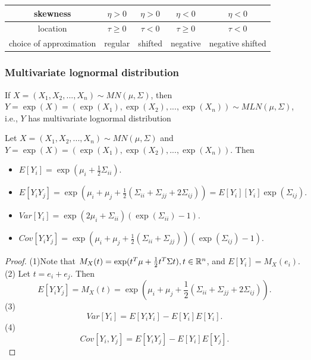 \begin{refsection}
\begin{note}
	
\begin{center}
	\begin{tabular}{|c|c|c|c|c|}
		\hline
		skewness                & $\eta > 0$   & $\eta>0$   & $\eta<0$      & $\eta<0$         \\ \hline
		location                & $\tau\geq 0$ & $\tau < 0$ & $\tau \geq 0$ & $\tau < 0$       \\ \hline
		choice of approximation & regular      & shifted    & negative      & negative shifted \\ \hline
	\end{tabular}

\end{center}	
\end{note}

\subsubsection{Multivariate lognormal distribution}

\begin{definition}\label{ch:theory-of-statistics:def:multivariateLognormalDistribution}
If $X=(X_1,X_2,...,X_n)\sim MN(\mu,\Sigma)$, then $Y=\exp(X)=(\exp(X_1),\exp(X_2),...,\exp(X_n)) \sim MLN(\mu, \Sigma)$,
i.e., $Y$ has multivariate lognormal distribution
\end{definition}

\begin{lemma}\label{ch:theory-of-statistics:th:BasicPropertiesMultivariateLognormal}
Let $X=(X_1,X_2,...,X_n)\sim MN(\mu, \Sigma)$ and $Y = \exp(X)=(\exp(X_1),\exp(X_2),...,\exp(X_n))$. Then
\begin{itemize}
	\item $E[Y_i] = \exp(\mu_i + \frac{1}{2}\Sigma_{ii})$.
	\item $E[Y_iY_j] = \exp(\mu_i+\mu_j + \frac{1}{2}(\Sigma_{ii} + \Sigma_{jj} + 2\Sigma_{ij})) = E[Y_i][Y_i]\exp(\Sigma_{ij}).$
	\item $Var[Y_i] = \exp(2\mu_i + \Sigma_{ii})(\exp(\Sigma_{ii}) - 1).$
	\item $Cov[Y_iY_j] = \exp(\mu_i+\mu_j + \frac{1}{2}(\Sigma_{ii} + \Sigma_{jj}))(\exp(\Sigma_{ij}) - 1).$
\end{itemize}	
	
\end{lemma}
\begin{proof}
(1)Note that $M_X(t) = \exp(t^T\mu + \frac{1}{2}t^T \Sigma t), t\in \mathbb{R}^n$, and $E[Y_i] = M_X(e_i)$.
(2) Let $t = e_i+e_j$. Then $$E[Y_iY_j] = M_X(t) = \exp(\mu_i+\mu_j + \frac{1}{2}(\Sigma_{ii} + \Sigma_{jj} + 2\Sigma_{ij})).$$
(3) $$Var[Y_i] = E[Y_iY_i]- E[Y_i]E[Y_i].$$
(4) $$Cov[Y_i,Y_j] = E[Y_iY_j]- E[Y_i]E[Y_j].$$
\end{proof}




\end{refsection}
